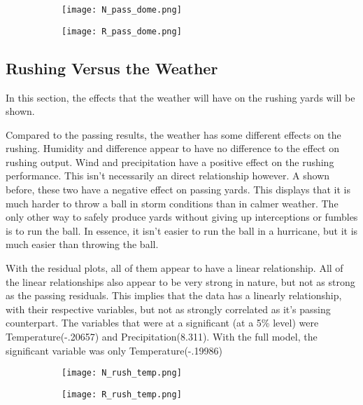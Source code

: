 \documentclass[12pt]{article}
\begin{document}
\begin{figure}[h!]
	\centering
	\begin{subfigure}[b]{0.4\linewidth}
		\texttt{[image: N\_pass\_dome.png]}
	\end{subfigure}
	\begin{subfigure}[b]{0.4\linewidth}
		\texttt{[image: R\_pass\_dome.png]}
	\end{subfigure}
\end{figure}



\subsection{Rushing Versus the Weather}
In this section, the effects that the weather will have on the rushing yards will be shown.

\quad Compared to the passing results, the weather has some different effects on the rushing. Humidity and difference appear to have no difference to the effect on rushing output. Wind and precipitation have a positive effect on the rushing performance. This isn't necessarily an direct relationship however. A shown before, these two have a negative effect on passing yards. This displays that it is much harder to throw a ball in storm conditions than in calmer weather. The only other way to safely produce yards without giving up interceptions or fumbles is to run the ball. In essence, it isn't easier to run the ball in a hurricane, but it is much easier than throwing the ball.

With the residual plots, all of them appear to have a linear relationship. All of the linear relationships also appear to be very strong in nature, but not as strong as the passing residuals. This implies that the data has a linearly relationship, with their respective variables, but not as strongly correlated as it's passing counterpart. The variables that were at a significant (at a 5\% level) were Temperature(-.20657) and Precipitation(8.311). With the full model, the significant variable was only Temperature(-.19986)

\begin{figure}[h!]
	\centering
	\begin{subfigure}[b]{0.4\linewidth}
		\texttt{[image: N\_rush\_temp.png]}
	\end{subfigure}
	\begin{subfigure}[b]{0.4\linewidth}
		\texttt{[image: R\_rush\_temp.png]}
	\end{subfigure}
\end{figure}
\end{document}

